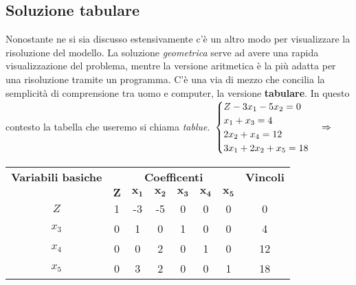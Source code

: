 \documentclass{article}
\begin{document}
\subsection{Soluzione tabulare}
Nonostante ne si sia discusso estensivamente c'è un altro modo per visualizzare la risoluzione del modello. La soluzione \textit{geometrica} serve ad avere una rapida visualizzazione del problema, mentre la versione aritmetica è la più adatta per una risoluzione tramite un programma. C'è una via di mezzo che concilia la semplicità di comprensione tra uomo e computer, la versione \textbf{tabulare}. In questo contesto la tabella che useremo si chiama \textit{tablue}.
$
  \\ \\ \\
  \begin{cases}
    Z-3x_1-5x_2 = 0        \\
    x_1 + x_3 = 4          \\
    2x_2 + x_4 = 12        \\
    3x_1 + 2x_2 + x_5 = 18 \\
  \end{cases}
  \Rightarrow
$
\begin{tabular}{|c|c|c|c|c|c|c|c|}
  \hline
  {\textbf{Variabili basiche}} & \multicolumn{6}{|c|}{\textbf{Coefficenti}} & \textbf{Vincoli}                                                                          \\
  \cline{1-7}
                               & $\mathbf{Z}$                               & $\mathbf{x_1}$   & $\mathbf{x_2}$ & $\mathbf{x_3}$ & $\mathbf{x_4}$ & $\mathbf{x_5}$ &    \\
  \hline
  $Z$                          & 1                                          & -3               & -5             & 0              & 0              & 0              & 0  \\
  $x_3$                        & 0                                          & 1                & 0              & 1              & 0              & 0              & 4  \\
  $x_4$                        & 0                                          & 0                & 2              & 0              & 1              & 0              & 12 \\
  $x_5$                        & 0                                          & 3                & 2              & 0              & 0              & 1              & 18 \\
  \hline
\end{tabular} \\ \\
\end{document}

